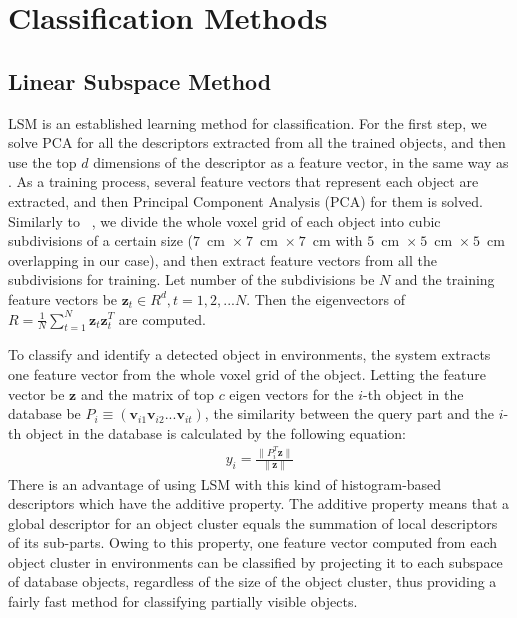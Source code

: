 \documentclass[a4paper, 10 pt, conference]{sty/ieeeconf}
\begin{document}
\section{Classification Methods}
\label{sec:classification}

\subsection{Linear Subspace Method}
\label{sec:subspace}
LSM is an established learning method for classification. 
For the first step, we solve PCA for all the descriptors extracted from all the trained objects, 
and then use the top $d$ dimensions of the descriptor as a feature vector, in the same way as \cite{kanezaki2011icra}.
As a training process, several feature vectors that represent each object are extracted, 
and then Principal Component Analysis (PCA) for them is solved. 
Similarly to ~\cite{kanezaki2011icra}, we divide the whole voxel grid of each object into 
cubic subdivisions of a certain size ($7$~cm~$\times~7$~cm~$\times~7$~cm with $5$~cm~$\times~5$~cm~$\times~5$~cm overlapping in our case), and then extract feature vectors from all the subdivisions for training. 
Let number of the subdivisions be $N$ 
and the training feature vectors be $\bm{z}_t \in R^d, t=1,2,...N$. 
Then the eigenvectors of $R=\frac{1}{N} \sum^{N}_{t=1} \bm{z}_t \bm{z}_t^T$ are computed. 

To classify and identify a detected object in environments, the system extracts one feature vector from the whole voxel grid of the object. 
Letting the feature vector be $\bm{z}$ and the matrix of top $c$ eigen vectors for the $i$-th object in the database be $P_i \equiv (\bm{v}_{i1} \bm{v}_{i2} ... \bm{v}_{it})$,
the similarity between the query part and the $i$-th object in the database is calculated by the following equation:
\begin{eqnarray}\label{eq:y_calc}
  y_i = \frac{\| P_i^T \bm{z} \|}{\| \bm{z} \|}
\end{eqnarray}
There is an advantage of using LSM with this kind of histogram-based descriptors which have the additive property. 
The additive property means that a global descriptor for an object cluster equals the summation of local descriptors of its sub-parts. 
Owing to this property, one feature vector computed from each object cluster in environments can be classified by projecting it to 
each subspace of database objects, regardless of the size of the object cluster, thus providing a fairly fast method for classifying partially visible objects.
\end{document}
